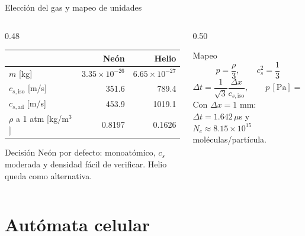 \documentclass[aspectratio=169]{beamer}
\begin{document}
\begin{frame}{Elección del gas y mapeo de unidades}
  \begin{columns}[T]
    \begin{column}{0.48\textwidth}
      \centering
      \scriptsize
      \begin{tabular}{lrr}
        \toprule
        & Neón & Helio \\
        \midrule
        $m$ [kg] & $3.35\times10^{-26}$ & $6.65\times10^{-27}$ \\
        $c_{s,\text{iso}}$ [m/s] & 351.6 & 789.4 \\
        $c_{s,\text{ad}}$ [m/s] & 453.9 & 1019.1 \\
        $\rho$ a 1 atm [kg/m$^3$] & 0.8197 & 0.1626 \\
        \bottomrule
      \end{tabular}
      \vspace{2mm}
      \begin{block}{Decisión}
        \scriptsize
        \alert{Neón} por defecto: monoatómico, $c_s$ moderada y densidad fácil
        de verificar. Helio queda como alternativa.
      \end{block}
    \end{column}
    \begin{column}{0.50\textwidth}
      \begin{block}{Mapeo}
        \footnotesize
        \[
          p=\frac{\rho}{3},\qquad c_s^2=\frac{1}{3}
        \]
        \[
          \Delta t=\frac{1}{\sqrt{3}}\frac{\Delta x}{c_{s,\text{iso}}},\qquad
          p\,[\text{Pa}]=\frac{\rho}{3}p_0
        \]
        Con $\Delta x=1$ mm: $\Delta t=1.642\,\mu$s y
        $N_c\approx 8.15\times10^{15}$ moléculas/partícula.
      \end{block}
    \end{column}
  \end{columns}
\end{frame}

\section{Autómata celular}
\end{document}
